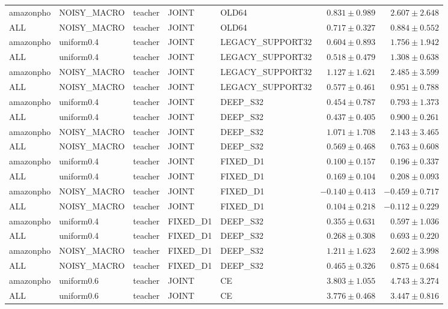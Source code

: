 \begin{longtable}{lllllrr}
amazonpho & NOISY\_MACRO & teacher & JOINT & OLD64 & $0.831 \pm 0.989$ & $2.607 \pm 2.648$ \\
ALL & NOISY\_MACRO & teacher & JOINT & OLD64 & $0.717 \pm 0.327$ & $0.884 \pm 0.552$ \\
amazonpho & uniform0.4 & teacher & JOINT & LEGACY\_SUPPORT32 & $0.604 \pm 0.893$ & $1.756 \pm 1.942$ \\
ALL & uniform0.4 & teacher & JOINT & LEGACY\_SUPPORT32 & $0.518 \pm 0.479$ & $1.308 \pm 0.638$ \\
amazonpho & NOISY\_MACRO & teacher & JOINT & LEGACY\_SUPPORT32 & $1.127 \pm 1.621$ & $2.485 \pm 3.599$ \\
ALL & NOISY\_MACRO & teacher & JOINT & LEGACY\_SUPPORT32 & $0.577 \pm 0.461$ & $0.951 \pm 0.788$ \\
amazonpho & uniform0.4 & teacher & JOINT & DEEP\_S32 & $0.454 \pm 0.787$ & $0.793 \pm 1.373$ \\
ALL & uniform0.4 & teacher & JOINT & DEEP\_S32 & $0.437 \pm 0.405$ & $0.900 \pm 0.261$ \\
amazonpho & NOISY\_MACRO & teacher & JOINT & DEEP\_S32 & $1.071 \pm 1.708$ & $2.143 \pm 3.465$ \\
ALL & NOISY\_MACRO & teacher & JOINT & DEEP\_S32 & $0.569 \pm 0.468$ & $0.763 \pm 0.608$ \\
amazonpho & uniform0.4 & teacher & JOINT & FIXED\_D1 & $0.100 \pm 0.157$ & $0.196 \pm 0.337$ \\
ALL & uniform0.4 & teacher & JOINT & FIXED\_D1 & $0.169 \pm 0.104$ & $0.208 \pm 0.093$ \\
amazonpho & NOISY\_MACRO & teacher & JOINT & FIXED\_D1 & $-0.140 \pm 0.413$ & $-0.459 \pm 0.717$ \\
ALL & NOISY\_MACRO & teacher & JOINT & FIXED\_D1 & $0.104 \pm 0.218$ & $-0.112 \pm 0.229$ \\
amazonpho & uniform0.4 & teacher & FIXED\_D1 & DEEP\_S32 & $0.355 \pm 0.631$ & $0.597 \pm 1.036$ \\
ALL & uniform0.4 & teacher & FIXED\_D1 & DEEP\_S32 & $0.268 \pm 0.308$ & $0.693 \pm 0.220$ \\
amazonpho & NOISY\_MACRO & teacher & FIXED\_D1 & DEEP\_S32 & $1.211 \pm 1.623$ & $2.602 \pm 3.998$ \\
ALL & NOISY\_MACRO & teacher & FIXED\_D1 & DEEP\_S32 & $0.465 \pm 0.326$ & $0.875 \pm 0.684$ \\
amazonpho & uniform0.6 & teacher & JOINT & CE & $3.803 \pm 1.055$ & $4.743 \pm 3.274$ \\
ALL & uniform0.6 & teacher & JOINT & CE & $3.776 \pm 0.468$ & $3.447 \pm 0.816$ \\

\end{longtable}
